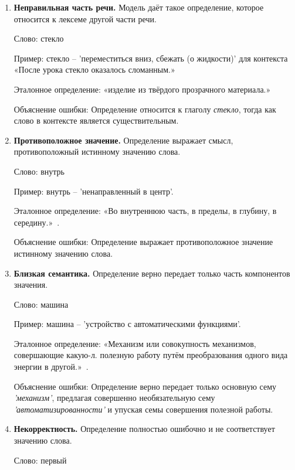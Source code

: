 \documentclass[LI,VKR]{HSEUniversity}
\begin{document}
\begin{enumerate}
\item \textbf{Неправильная часть речи.} Модель даёт такое определение, которое относится к лексеме другой части речи.

   Слово: стекло

   Пример: стекло – ’переместиться вниз, сбежать (о жидкости)’ для контекста «После урока стекло оказалось сломанным.»

   Эталонное определение: «изделие из твёрдого прозрачного материала.»~\cite{TolkovyDmitriev}

   Объяснение ошибки: Определение относится к глаголу \textit{стекло}, тогда как слово в контексте является существительным.

\item \textbf{Противоположное значение.} Определение выражает смысл, противоположный истинному значению слова.

   Слово: внутрь

   Пример: внутрь – ’ненаправленный в центр’.

   Эталонное определение: «Во внутреннюю часть, в пределы, в глубину, в середину.»~\cite{TolkovyKuznetsov}.

   Объяснение ошибки: Определение выражает противоположное значение истинному значению слова.

\item \textbf{Близкая семантика.} Определение верно передает только часть компонентов значения.

   Слово: машина

   Пример: машина – ’устройство с автоматическими функциями’.

   Эталонное определение: «Механизм или совокупность механизмов, совершающие какую-л. полезную работу путём преобразования одного вида энергии в другой.»~\cite{TolkovyKuznetsov}.

   Объяснение ошибки: Определение верно передает только основную сему \textit{’механизм’}, предлагая совершенно необязательную сему \textit{’автоматизированности’} и упуская семы совершения полезной работы.

%
%
%

\item \textbf{Некорректность.} Определение полностью ошибочно и не соответствует значению слова.

   Слово: первый


\end{enumerate}
\end{document}

